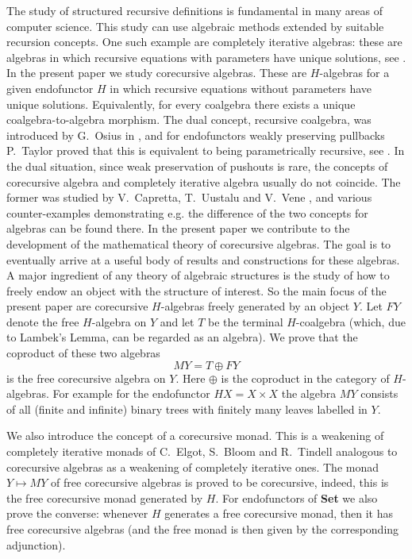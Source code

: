 \documentclass{LMCS}
\theoremstyle{plain}
\theoremstyle{definition}
\numberwithin{equation}{section}
\begin{document}
The study of structured recursive definitions is fundamental in many
areas of computer science. This study can use algebraic methods
extended by suitable recursion concepts. One such example are
completely iterative algebras: these are algebras in which recursive
equations with parameters have unique solutions, see \cite{m_cia}. In
the present paper we study corecursive algebras.  These are
$H$-algebras for a given endofunctor $H$ in which recursive equations
without parameters have unique solutions. Equivalently, for every
coalgebra there exists a unique coalgebra-to-algebra morphism. The
dual concept, recursive coalgebra, was introduced by G.~Osius in
\cite{g}, and for endofunctors weakly preserving pullbacks P.~Taylor
proved that this is equivalent to being parametrically recursive, see
\cite{t}. In the dual situation, since weak preservation of pushouts
is rare, the concepts of corecursive algebra and completely iterative
algebra usually do not coincide. The former was studied by
V.~Capretta, T.~Uustalu and V.~Vene \cite{cuv2}, and various
counter-examples demonstrating e.g. the difference of the two concepts
for algebras can be found there. In the present paper we contribute to
the development of the mathematical theory of corecursive
algebras. The goal is to eventually arrive at a useful body of results
and constructions for these algebras. A major ingredient of any theory
of algebraic structures is the study of how to freely endow an object
with the structure of interest. So the main focus of the present paper
are corecursive $H$-algebras freely generated by an object $Y$. Let
$FY$ denote the free $H$-algebra on $Y$ and let $T$ be the terminal
$H$-coalgebra (which, due to Lambek's Lemma, can be regarded as an
algebra). We prove that the coproduct of these two
algebras $$MY=T\oplus FY$$ is the free corecursive algebra on
$Y$. Here $\oplus $ is the coproduct in the category of
$H$-algebras. For example for the endofunctor $HX=X\times X$ the
algebra $MY$ consists of all (finite and infinite) binary trees with
finitely many leaves labelled in $Y$.

We also introduce the concept of a corecursive monad.  This is a
weakening of completely iterative monads of C.~Elgot, S.~Bloom and R.~Tindell \cite{ebt} 
analogous to corecursive algebras as a weakening of completely
iterative ones.  The monad $Y\mapsto MY$ of free corecursive algebras
is proved to be corecursive, indeed, this is the free corecursive
monad generated by $H$. For endofunctors of {\bf Set} we also prove
the converse: whenever $H$ generates a free corecursive monad, then it
has free corecursive algebras (and the free monad is then given by the
corresponding adjunction).
\end{document}
